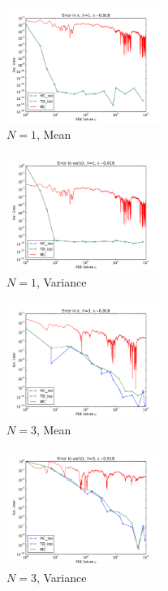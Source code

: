 \documentclass{anstrans} \usepackage{amsmath} \usepackage{amssymb}
\begin{document}
  \begin{figure}[htb] \includegraphics[width=0.45\textwidth]{../graphics/N1_h5_MCHC} \caption{$N=1$, Mean}
    \label{n1mean} \end{figure} \begin{figure}[htb]
    \includegraphics[width=0.45\textwidth]{../graphics/N1_h5_MCHC_2} \caption{$N=1$, Variance} \label{n1var}
  \end{figure}

  \begin{figure}[htb] \includegraphics[width=0.45\textwidth]{../graphics/N3_h5_MCHC} \caption{$N=3$, Mean}
    \label{n3mean} \end{figure} \begin{figure}[htb]
    \includegraphics[width=0.45\textwidth]{../graphics/N3_h5_MCHC_2} \caption{$N=3$, Variance} \label{n3var}
  \end{figure}
\end{document}
